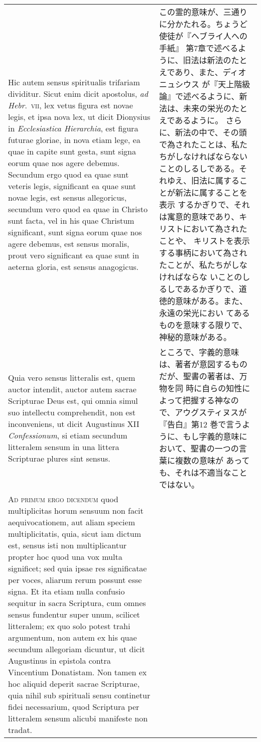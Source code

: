 \documentclass[10pt]{jsarticle}
\begin{document}
\begin{longtable}{p{21em}p{21em}}
\\


Hic autem sensus spiritualis trifariam dividitur. Sicut enim dicit
apostolus, {\itshape ad Hebr}.~{\scshape vii}, lex vetus figura est
novae legis, et ipsa nova lex, ut dicit Dionysius in {\itshape
Ecclesiastica Hierarchia}, est figura futurae gloriae, in nova etiam
lege, ea quae in capite sunt gesta, sunt signa eorum quae nos agere
debemus. Secundum ergo quod ea quae sunt veteris legis, significant ea
quae sunt novae legis, est sensus allegoricus, secundum vero quod ea
quae in Christo sunt facta, vel in his quae Christum significant, sunt
signa eorum quae nos agere debemus, est sensus moralis, prout vero
significant ea quae sunt in aeterna gloria, est sensus anagogicus.



&

この霊的意味が、三通りに分かたれる。ちょうど使徒が『ヘブライ人への手紙』
第7章で述べるように、旧法は新法のたとえであり、また、ディオニュシウス
が『天上階級論』で述べるように、新法は、未来の栄光のたとえであるように。
さらに、新法の中で、その頭で為されたことは、私たちがしなければならない
ことのしるしである。それゆえ、旧法に属することが新法に属することを表示
するかぎりで、それは寓意的意味であり、キリストにおいて為されたことや、
キリストを表示する事柄において為されたことが、私たちがしなければならな
いことのしるしであるかぎりで、道徳的意味がある。また、永遠の栄光におい
てあるものを意味する限りで、神秘的意味がある。



\\


Quia vero sensus litteralis est, quem auctor intendit, auctor autem
sacrae Scripturae Deus est, qui omnia simul suo intellectu
comprehendit, non est inconveniens, ut dicit Augustinus XII {\itshape
Confessionum}, si etiam secundum litteralem sensum in una littera
Scripturae plures sint sensus.


&

ところで、字義的意味は、著者が意図するものだが、聖書の著者は、万物を同
時に自らの知性によって把握する神なので、アウグスティヌスが『告白』第12
巻で言うように、もし字義的意味において、聖書の一つの言葉に複数の意味が
あっても、それは不適当なことではない。


\\


{\scshape Ad primum ergo dicendum} quod multiplicitas horum sensuum
non facit aequivocationem, aut aliam speciem multiplicitatis, quia,
sicut iam dictum est, sensus isti non multiplicantur propter hoc quod
una vox multa significet; sed quia ipsae res significatae per voces,
aliarum rerum possunt esse signa. Et ita etiam nulla confusio sequitur
in sacra Scriptura, cum omnes sensus fundentur super unum, scilicet
litteralem; ex quo solo potest trahi argumentum, non autem ex his quae
secundum allegoriam dicuntur, ut dicit Augustinus in epistola contra
Vincentium Donatistam. Non tamen ex hoc aliquid deperit sacrae
Scripturae, quia nihil sub spirituali sensu continetur fidei
necessarium, quod Scriptura per litteralem sensum alicubi manifeste
non tradat.



\end{longtable}
\end{document}
